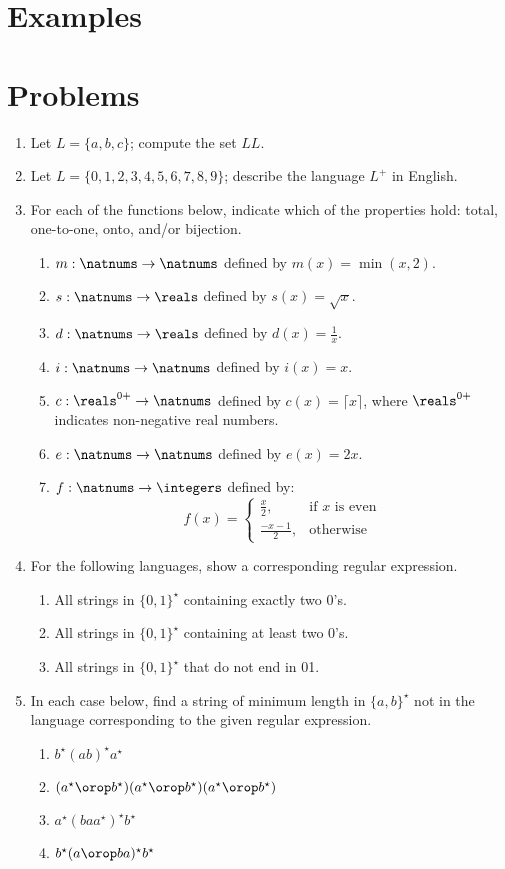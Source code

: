\section{Examples}

\section{Problems}

\begin{enumerate}
	\item Let $L = \{a, b, c\}$; compute the set $LL$.
	\item Let $L = \{0, 1, 2, 3, 4, 5, 6, 7, 8, 9\}$; describe the language $L^+$ in English.
	\item For each of the functions below, indicate which of the properties hold: total, one-to-one, onto, and/or bijection.
	\begin{enumerate}
		\item $m: \natnums \to \natnums$ defined by $m(x) = \min(x, 2)$.
		\item $s: \natnums \to \reals$ defined by $s(x) = \sqrt{x}$.
		\item $d: \natnums \to \reals$ defined by $d(x) = \frac{1}{x}$.
		\item $i: \natnums \to \natnums$ defined by $i(x) = x$.
		\item $c: \reals^{0+} \to \natnums$ defined by $c(x) = \lceil x \rceil$, where $\reals^{0+}$ indicates non-negative real numbers.
		\item $e: \natnums \to \natnums$ defined by $e(x) = 2x$.
		\item $f: \natnums \to \integers$ defined by:
		\[
			f(x) = 
			\begin{cases}
				\frac{x}{2},& \text{if $x$ is even}\\
				\frac{-x-1}{2},& \text{otherwise}
			\end{cases}
		\]
	\end{enumerate}
	
	\item For the following languages, show a corresponding regular expression.
	\begin{enumerate}
		\item All strings in $\{0,1\}^\star$ containing exactly two 0's.
		\item All strings in $\{0,1\}^\star$ containing at least two 0's.
		\item All strings in $\{0,1\}^\star$ that do not end in 01.
	\end{enumerate}

	\item  In each case below, find a string of minimum length in $\{a, b\}^\star$ not in the language corresponding to the given regular expression.
	\begin{enumerate}
		\item $b^\star (ab)^\star a^\star$
		\item $(a^\star \orop b^\star)(a^\star \orop b^\star)(a^\star \orop b^\star)$
		\item $a^\star (baa^\star)^\star b^\star$
		\item $b^\star (a \orop ba)^\star b^\star$
	\end{enumerate}
\end{enumerate}
